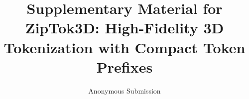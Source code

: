


% 
% 


\documentclass[letterpaper]{article}
\usepackage[submission]{aaai2027}
\usepackage[hyphens]{url}
\usepackage{graphicx}
\def\UrlFont{\rm}
\usepackage{natbib}
\usepackage{caption}
\frenchspacing
\usepackage{booktabs}
\usepackage{multirow}
\usepackage{amsmath}
\usepackage{amssymb}
\usepackage{xcolor}
\usepackage{array}

\newcommand{\ours}{ZipTok3D}

\renewcommand{\thesection}{S\arabic{section}}
\renewcommand{\thesubsection}{S\arabic{section}.\arabic{subsection}}
\renewcommand{\thefigure}{\Alph{figure}}
\renewcommand{\thetable}{\Alph{table}}
\renewcommand{\theequation}{S\arabic{equation}}
\setcounter{secnumdepth}{2}

\title{Supplementary Material for \ours{}: High-Fidelity 3D Tokenization with Compact Token Prefixes}
\author{Anonymous Submission}
\affiliations{}


\maketitle

\section{Prefix-Length and Refinement-Depth Analysis}
\label{sec:full-sweeps}

